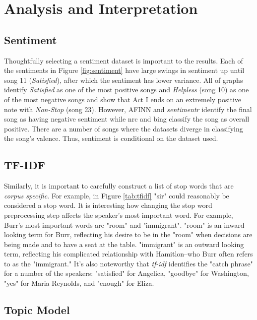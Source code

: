 \documentclass{article}
\begin{document}
\section{Analysis and Interpretation}

\subsection{Sentiment}

Thoughtfully selecting a sentiment dataset is important to the results. Each of the sentiments in Figure \ref{fig:sentiment} have large swings in sentiment up until song 11 (\emph{Satisfied}), after which the sentiment has lower variance. All of graphs identify \emph{Satisfied} as one of the most positive songs and \emph{Helpless} (song 10) as one of the most negative songs and show that Act I ends on an extremely positive note with \emph{Non-Stop} (song 23). However, AFINN and \emph{sentimentr} identify the final song as having negative sentiment while nrc and bing classify the song as overall positive. There are a number of songs where the datasets diverge in classifying the song's valence. Thus, sentiment is conditional on the dataset used.

\subsection{TF-IDF}

Similarly, it is important to carefully construct a list of stop words that are \emph{corpus specific}. For example, in Figure \ref{tab:tfidf} "sir" could reasonably be considered a stop word. It is interesting how changing the stop word preprocessing step affects the speaker's most important word. For example, Burr's most important words are "room" and "immigrant". "room" is an inward looking term for Burr, reflecting his desire to be in the "room" when decisions are being made and to have a seat at the table. "immigrant" is an outward looking term, reflecting his complicated relationship with Hamitlon--who Burr often refers to as the "immigrant." It's also noteworthy that \emph{tf-idf} identifies the "catch phrase" for a number of the speakers: "satisfied" for Angelica, "goodbye" for Washington, "yes" for Maria Reynolds, and "enough" for Eliza.  

\subsection{Topic Model}
\end{document}
